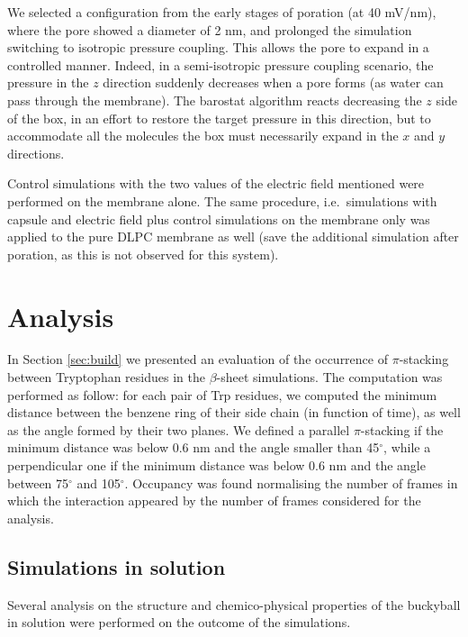 We selected a configuration from the early stages of poration (at 40 mV/nm), where the pore showed a diameter of 2 nm, and prolonged the simulation switching to isotropic pressure coupling. This allows the pore to expand in a controlled manner. Indeed, in a semi-isotropic pressure coupling scenario, the pressure in the $z$ direction suddenly decreases when a pore forms (as water can pass through the membrane). The barostat algorithm reacts decreasing the $z$ side of the box, in an effort to restore the target pressure in this direction, but to accommodate all the molecules the box must necessarily expand in the $x$ and $y$ directions.

Control simulations with the two values of the electric field mentioned were performed on the membrane alone. The same procedure, i.e.\ simulations with capsule and electric field plus control simulations on the membrane only was applied to the pure DLPC membrane as well (save the additional simulation after poration, as this is not observed for this system).


\section{Analysis} \label{sec:analysis}

In Section \ref{sec:build} we presented an evaluation of the occurrence of $\pi$-stacking between Tryptophan residues in the $\beta$-sheet simulations. The computation was performed as follow: for each pair of Trp residues, we computed the minimum distance between the benzene ring of their side chain (in function of time), as well as the angle formed by their two planes. We defined a parallel $\pi$-stacking if the minimum distance was below 0.6 nm and the angle smaller than 45$^{\circ}$, while a perpendicular one if the minimum distance was below 0.6 nm and the angle between 75$^{\circ}$ and 105$^{\circ}$. Occupancy was found normalising the number of frames in which the interaction appeared by the number of frames considered for the analysis.    
    
\subsection{Simulations in solution}
Several analysis on the structure and chemico-physical properties of the buckyball in solution were performed on the outcome of the simulations.

